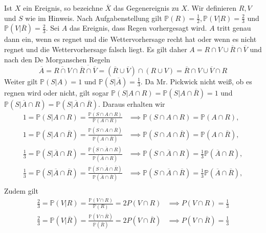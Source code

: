 \documentclass[uebung]{lecture}
\renewcommand{\P}{\mathbb{P}}
\begin{document}
\begin{aufgabe}
    Ist $X$ ein Ereignis, so bezeichne $\overline{X}$ das Gegenereignis zu $X$.
    Wir definieren $R, V$ und $S$ wie im Hinweis. Nach Aufgabenstellung gilt $\P(R) = \frac{1}{2},\P(V|R) = \frac{2}{3}$ und  $\P(V|\overline R) = \frac{2}{3}$. Sei $A$ das Ereignis, dass Regen vorhergesagt wird.
    $A$ tritt genau dann ein, wenn es regnet und die Wettervorhersage recht hat oder wenn es nicht regnet und die Wettervorhersage falsch liegt. Es gilt daher
    $A = R \cap V \cup \overline R \cap \overline V$ und nach den De Morganschen Regeln 
    \[
        \overline{A} = \overline{R \cap V} \cap \overline{\overline{R} \cap \overline{V}} = (\overline{R} \cup \overline{V}) \cap (R \cup V) = \overline{R} \cap V \cup \overline{V} \cap R
    \]
    Weiter gilt $\P(S|A) = 1$ und $\P(S|\overline A) = \frac{1}{3}$. 
    Da Mr. Pickwick nicht weiß, ob es regnen wird oder nicht, gilt sogar $\P(S|A\cap R) = \P(S|A\cap \overline R) = 1 $ und $\P(S|\overline A \cap R) = \P(S| \overline A \cap \overline R)$.
    Daraus erhalten wir
    \begin{align*}
        1 = \P(S|A\cap R) = \frac{\P(S \cap A \cap R)}{\P(A \cap R)} &\implies \P(S \cap A \cap R) = \P(A \cap R),\\
        1 = \P(S|A\cap \overline R) = \frac{\P(S \cap A \cap \overline R)}{\P(A \cap \overline R)} &\implies \P(S \cap A \cap \overline R) = \P(A \cap \overline R),\\
        \frac{1}{3} = \P(S|\overline A\cap R) = \frac{\P(S \cap \overline A \cap R)}{\P(\overline A \cap R)} &\implies \P(S \cap \overline A \cap R) = \frac{1}{3}\P(\overline A \cap R),\\
        \frac{1}{3} = \P(S|\overline A\cap \overline R) = \frac{\P(S \cap \overline A \cap \overline R)}{\P(\overline A \cap \overline R)} &\implies \P(S \cap \overline A \cap \overline R) = \frac{1}{3}\P(\overline A \cap \overline R),\\
    \end{align*}
    Zudem gilt
    \begin{align*}
        \frac{2}{3} = \P(V | R) = \frac{\P(V \cap R)}{\P(R)} = 2 P(V\cap R) &\implies P(V\cap R) = \frac{1}{3}\\
        \frac{2}{3} = \P(V | \overline R) = \frac{\P(V \cap \overline R)}{\P(\overline R)} = 2 P(V\cap \overline R) &\implies P(V\cap \overline R) = \frac{1}{3}\\

\end{align*}
\end{aufgabe}
\end{document}
